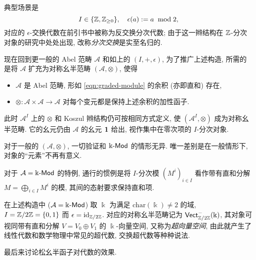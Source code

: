 \begin{example}[分次模与分次代数]
	典型场景是
	\[ I \in \{\mathbb{Z}, \mathbb{Z}_{\geq 0} \}, \quad \epsilon(a) := a \;\bmod 2 , \]
	对应的 $\epsilon$-交换代数在前引书中被称为反交换分次代数; 由于这一辫结构在 $\mathbb{Z}$-分次对象的研究中处处出现, 改称\emph{分次交换}是实至名归的.
	
	现在回到更一般的 Abel 范畴 $\mathcal{A}$ 和如上的 $(I, +, \epsilon)$, 为了推广上述构造, 所需的是将 $\mathcal{A}$ 扩充为对称幺半范畴 $(\mathcal{A}, \otimes)$, 使得
	\begin{itemize}
		\item $\mathcal{A}$ 是 Abel 范畴, 形如 \eqref{eqn:graded-module} 的余积 (亦即直和) 存在,
		\item $\otimes: \mathcal{A} \times \mathcal{A} \to \mathcal{A}$ 对每个变元都是保持上述余积的加性函子.
	\end{itemize}
	此时 $\mathcal{A}^I$ 上的 $\otimes$ 和 Koszul 辫结构仍可按相同方式定义, 使 $(\mathcal{A}^I, \otimes)$ 成为对称幺半范畴. 它的幺元仍由 $\mathcal{A}$ 的幺元 $\bm{1}$ 给出, 视作集中在零次项的 $I$-分次对象.
	
	对于一般的 $(\mathcal{A}, \otimes)$, 一切验证和 $\Bbbk\text{-}\mathsf{Mod}$ 的情形无异. 唯一差别是在一般情形下, 对象的``元素''不再有意义. 
\end{example}

\begin{convention}
	对于 $\mathcal{A} = \Bbbk\text{-}\mathsf{Mod}$ 的特例, 通行的惯例是将 $I$-分次模 $(M^i)_{i \in I}$ 看作带有直和分解 $M = \bigoplus_{i \in I} M^i$ 的模, 其间的态射要求保持直和项.
\end{convention}

\begin{example}\label{eg:superspace}
	在上述构造中 ($\mathcal{A} = \Bbbk\text{-}\mathsf{Mod}$) 取 $\Bbbk$ 为满足 $\mathrm{char}(\Bbbk) \neq 2$ 的域, $I = \mathbb{Z}/2\mathbb{Z} = \{0, 1\}$ 而 $\epsilon = \mathrm{id}_{\mathbb{Z}/2\mathbb{Z}}$. 对应的对称幺半范畴记为 $\mathsf{Vect}^-_{\mathbb{Z}/2\mathbb{Z}}(\Bbbk)$, 其对象可视同带有直和分解 $V = V_0 \oplus V_1$ 的 $\Bbbk$-向量空间, 又称为\emph{超向量空间}, 由此就产生了线性代数和数学物理中常见的超代数, 交换超代数等种种说法.
\end{example}

最后来讨论松幺半函子对代数的效果.

